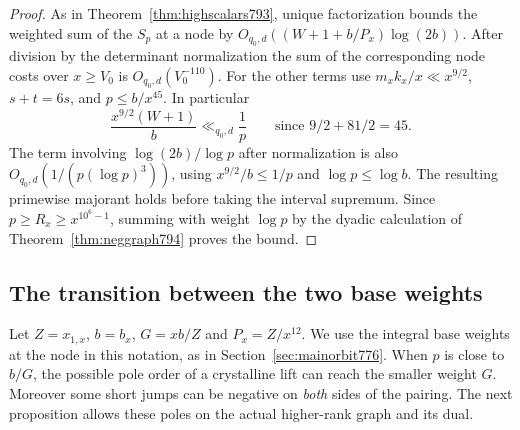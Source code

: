 \documentclass[a4paper,11pt]{article}
\theoremstyle{definition}
\theoremstyle{remark}
\numberwithin{equation}{section}
\begin{document}
\begin{proof}
As in Theorem~\ref{thm:highscalars793}, unique factorization
bounds the weighted sum of the \(S_p\) at a node by
\(O_{q_0,d}((W+1+b/P_x)\log(2b))\). After division by
the determinant normalization the sum of the corresponding
node costs over \(x\ge V_0\) is \(O_{q_0,d}(V_0^{-110})\).
For the other terms use \(m_x k_x/x\ll x^{9/2}\),
\(s+t=6s\), and \(p\le b/x^{45}\). In particular
\[
       \frac{x^{9/2}(W+1)}b\ll_{q_0,d}\frac1p
       \qquad\text{since }9/2+81/2=45.
\]
The term involving \(\log(2b)/\log p\) after normalization
is also \(O_{q_0,d}(1/(p(\log p)^3))\), using
\(x^{9/2}/b\le1/p\) and \(\log p\le\log b\).
The resulting primewise majorant holds before taking the
interval supremum. Since \(p\ge R_x\ge x^{10^6-1}\),
summing with weight \(\log p\) by the dyadic calculation
of Theorem~\ref{thm:neggraph794} proves the bound.
\end{proof}
\clearpage

\subsection{The transition between the two base weights}
\label{sec:weighttransition796}
Let \(Z=x_{1,x}\), \(b=b_x\), \(G=xb/Z\) and \(P_x=Z/x^{12}\).
We use the integral base weights at the node in this notation,
as in Section~\ref{sec:mainorbit776}. When \(p\) is close to \(b/G\),
the possible pole order of a crystalline lift can reach the
smaller weight \(G\). Moreover some short jumps can be negative
on \emph{both} sides of the pairing. The next proposition
allows these poles on the actual higher-rank graph and its dual.
\end{document}
